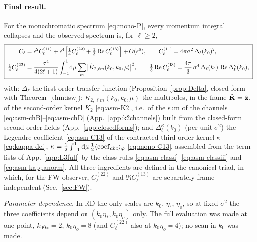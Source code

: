 \paragraph{Final result.}  For the monochromatic spectrum \eqref{eq:mono-P}, every momentum integral collapses and the observed spectrum is, for $\ell\ge2$,
\begin{equation}
\boxed{\;\begin{aligned}
C_\ell&=\epsilon^2C^{(11)}_\ell+\epsilon^4\Big[\tfrac14C^{(22)}_\ell+\tfrac13\operatorname{Re} C^{(13)}_\ell\Big]+O(\epsilon^6),\qquad C^{(11)}_\ell=4\pi\sigma^2\,\Delta_\ell(k_0)^2,\\
\tfrac14C^{(22)}_\ell&=\frac{\sigma^4}{4(2\ell+1)}\int_{-1}^1\!\mathrm d\mu\sum_m\big|\tilde K_{2,\ell m}(k_0,k_0,\mu)\big|^2,\qquad
\tfrac13\operatorname{Re} C^{(13)}_\ell=\frac{4\pi}3\,\sigma^4\,\Delta_\ell(k_0)\,\operatorname{Re}\Delta^\kappa_\ell(k_0),
\end{aligned}\;}
\label{eq:mono-final}
\end{equation}
with: $\Delta_\ell$ the first-order transfer function (Proposition~\ref{prop:Delta}, closed form with Theorem~\ref{thm:isw}); $\tilde K_{2,\ell m}(k_0,k_0,\mu)$ the
multipoles, in the frame $\hat{\mathbf K}=\hat{\mathbf z}$, of the second-order kernel $K_2$ \eqref{eq:asm-K2}, i.e.\ of the sum of the channels
\eqref{eq:asm-chB}--\eqref{eq:asm-chD} (App.~\ref{app:k2channels}) built from the closed-form second-order fields (App.~\ref{app:closedforms}); and
$\Delta^\kappa_\ell(k_0)$ (per unit $\sigma^2$) the Legendre coefficient \eqref{eq:asm-C13} of the contracted third-order kernel $\kappa$
\eqref{eq:kappa-def}, $\kappa=\tfrac12\int_{-1}^1\mathrm d\mu\,\tfrac12\langle{\rm coef}_{abc}\rangle_\varphi$ \eqref{eq:mono-C13}, assembled from the term lists of
App.~\ref{app:L3full} by the class rules \eqref{eq:asm-classi}--\eqref{eq:asm-classiii} and \eqref{eq:asm-kappanorm}.  All three ingredients are defined
in the canonical triad, in which, for the FW observer, $C^{(22)}_\ell$ and $\Re C^{(13)}_\ell$ are separately frame independent (Sec.~\ref{sec:FW}).

\emph{Parameter dependence.}  In RD the only scales are $k_0$, $\eta_*$, $\eta_o$, so at fixed $\sigma^2$ the three coefficients depend on
$(k_0\eta_*,k_0\eta_o)$ only.  The full evaluation was made at one point, $k_0\eta_*=2$, $k_0\eta_o=8$ (and $C^{(22)}_\ell$ also at $k_0\eta_o=4$); no
scan in $k_0$ was made.

